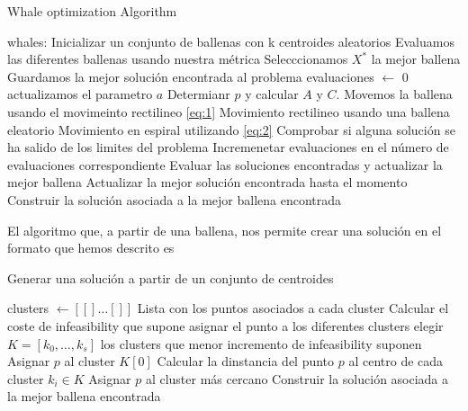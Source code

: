 \documentclass[11pt]{article}
\begin{document}
\begin{algorithm}[H]
  \caption{Whale optimization Algorithm}
  \label{alg-lsearch}
  \begin{algorithmic}[1]
    \State whales: Inicializar un conjunto de ballenas con k centroides aleatorios
    \State Evaluamos las diferentes ballenas usando nuestra métrica 
    \State Selecccionamos $X^*$ la mejor ballena
    \State Guardamos la mejor solución encontrada al problema
    \State evaluaciones $\leftarrow$ 0
    \State actualizamos el parametro $a$
    \State Determianr $p$ y calcular  $A$ y $C$.
    \State Movemos la ballena usando el movimeinto rectilineo \eqref{eq:1}
    \State Movimiento rectilineo usando una ballena eleatorio
    \EndIf
    \Else
    \State Movimiento en espiral utilizando \eqref{eq:2}
    \EndIf
    \EndFor 
    \State Comprobar si alguna solución se ha salido de los limites del problema
    \State Incremenetar evaluaciones en el número de evaluaciones correspondiente
    \State Evaluar las soluciones encontradas y actualizar la mejor ballena 
    \State Actualizar la mejor solución encontrada hasta el momento
    \EndIf
    \EndWhile
    \State
    \Return Construir la solución asociada a la mejor ballena encontrada
    \EndProcedure
  \end{algorithmic}
\end{algorithm}

El algoritmo que, a partir de una ballena, nos permite crear una solución en el
formato que hemos descrito es 


\begin{algorithm}[H]
  \caption{Generar una solución a partir de un conjunto de centroides}
  \label{alg-lsearch}
  \begin{algorithmic}[1]
    \State clusters $\leftarrow [[]\dots[]]$  Lista con los puntos asociados a cada cluster
    \State Calcular el coste de infeasibility que supone asignar el punto a los diferentes clusters 
    \State elegir $K = [k_0,\dots,k_s]$ los clusters que menor incremento de infeasibility suponen
    \State Asignar $p$ al cluster $K[0]$
    \Else
    \State Calcular la dinstancia del punto $p$ al centro de cada cluster $k_i \in K$
    \State Asignar $p$ al cluster más cercano
    \EndIf
    \EndFor
    \State
    \Return Construir la solución asociada a la mejor ballena encontrada
    \EndProcedure
  \end{algorithmic}
\end{algorithm}
\end{document}
